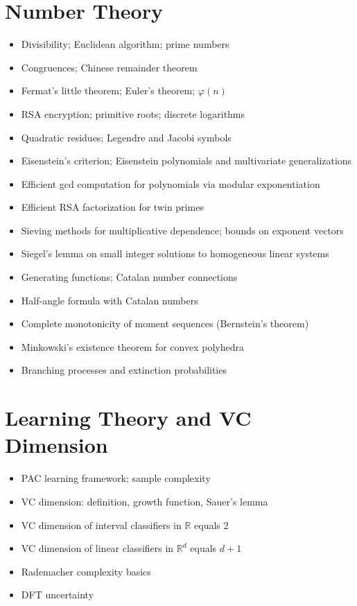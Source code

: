 \documentclass{amsart}
\begin{document}
\section{Number Theory}

\begin{itemize}
  \item Divisibility; Euclidean algorithm; prime numbers
  \item Congruences; Chinese remainder theorem
  \item Fermat's little theorem; Euler's theorem; $\varphi(n)$
  \item RSA encryption; primitive roots; discrete logarithms
  \item Quadratic residues; Legendre and Jacobi symbols
  \item Eisenstein's criterion; Eisenstein polynomials and multivariate generalizations
  \item Efficient gcd computation for polynomials via modular exponentiation
  \item Efficient RSA factorization for twin primes
  \item Sieving methods for multiplicative dependence; bounds on exponent vectors
  \item Siegel's lemma on small integer solutions to homogeneous linear systems
  \item Generating functions; Catalan number connections
  \item Half-angle formula with Catalan numbers
  \item Complete monotonicity of moment sequences (Bernstein's theorem)
  \item Minkowski's existence theorem for convex polyhedra
  \item Branching processes and extinction probabilities
\end{itemize}

\section{Learning Theory and VC Dimension}

\begin{itemize}
  \item PAC learning framework; sample complexity
  \item VC dimension: definition, growth function, Sauer's lemma
  \item VC dimension of interval classifiers in $\mathbb{R}$ equals 2
  \item VC dimension of linear classifiers in $\mathbb{R}^d$ equals $d+1$
  \item Rademacher complexity basics
  \item DFT uncertainty
\end{itemize}
\end{document}
